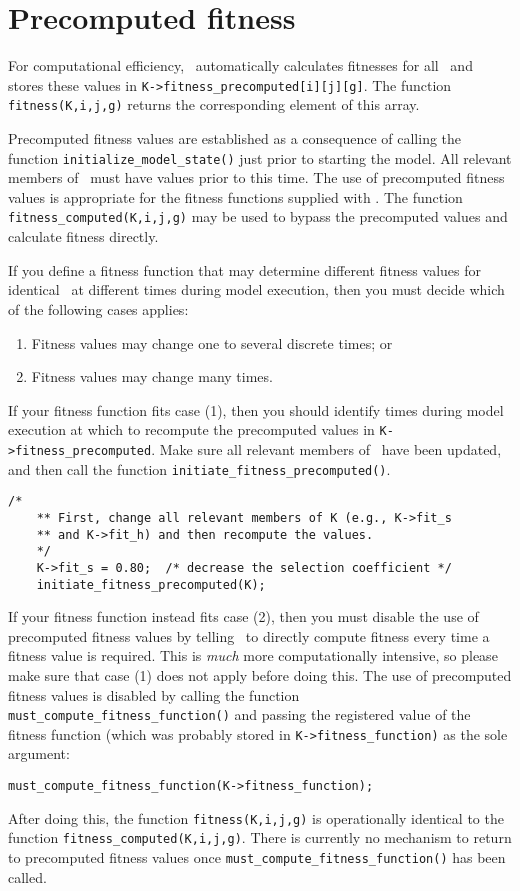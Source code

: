 \section{Precomputed fitness}

For computational efficiency, \K\ automatically calculates fitnesses for all \Lijg\ and stores these values in \lstinline{K->fitness_precomputed[i][j][g]}.  The function \lstinline{fitness(K,i,j,g)} returns the corresponding element of this array.

Precomputed fitness values are established as a consequence of calling the function \lstinline{initialize_model_state()} just prior to starting the model.  All relevant members of \KK\ must have values prior to this time.  The use of precomputed fitness values is appropriate for the fitness functions supplied with \K.  The function \lstinline{fitness_computed(K,i,j,g)} may be used to bypass the precomputed values and calculate fitness directly.

If you define a fitness function that may determine different fitness values for identical \Lijg\ at different times during model execution, then you must decide which of the following cases applies:
\begin{enumerate}
	\item Fitness values may change one to several discrete times; or
	\item Fitness values may change many times. 
\end{enumerate}
If your fitness function fits case (1), then you should identify times during model execution at which to recompute the precomputed values in \lstinline{K->fitness_precomputed}.  Make sure all relevant members of \KK\ have been updated, and then call the function \lstinline{initiate_fitness_precomputed()}.
\begin{lstlisting}[gobble=4]
    /*
    ** First, change all relevant members of K (e.g., K->fit_s 
    ** and K->fit_h) and then recompute the values.
    */
    K->fit_s = 0.80;  /* decrease the selection coefficient */
    initiate_fitness_precomputed(K);
\end{lstlisting}

If your fitness function instead fits case (2), then you must disable the use of precomputed fitness values by telling \K\ to directly compute fitness every time a fitness value is required.  This is {\em much} more computationally intensive, so please make sure that case (1) does not apply before doing this.  The use of precomputed fitness values is disabled by calling the function \lstinline{must_compute_fitness_function()} and passing the registered value of the fitness function (which was probably stored in \lstinline{K->fitness_function)} as the sole argument:
\begin{lstlisting}[gobble=4]
    must_compute_fitness_function(K->fitness_function);
\end{lstlisting}
After doing this, the function \lstinline{fitness(K,i,j,g)} is operationally identical to the function \lstinline{fitness_computed(K,i,j,g)}.  There is currently no mechanism to return to precomputed fitness values once \lstinline{must_compute_fitness_function()} has been called.

